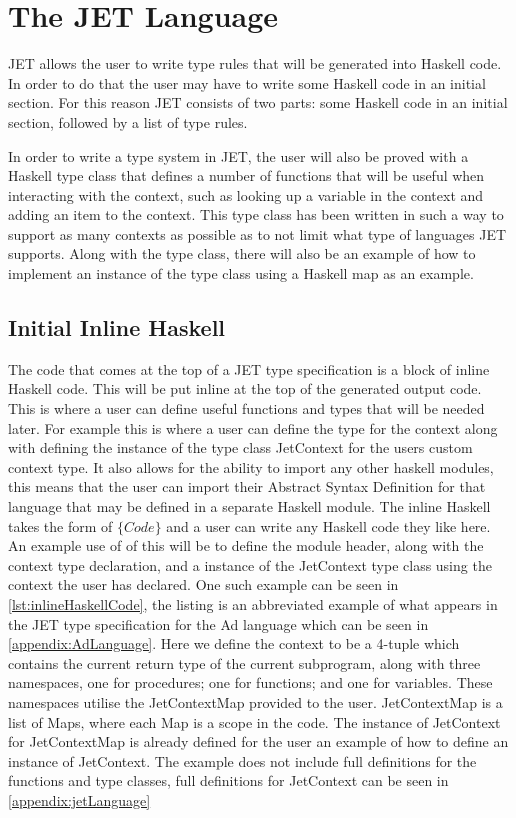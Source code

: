\section{The JET Language}

JET allows the user to write type rules that will be generated into Haskell code.
In order to do that the user may have to write some Haskell code in an initial section.
For this reason JET consists of two parts: some Haskell code in an initial section, followed by a list of type rules.

In order to write a type system in JET, the user will also be proved with a Haskell type class that defines a number of functions that will be useful when interacting with the context, such as looking up a variable in the context and adding an item to the context.
This type class has been written in such a way to support as many contexts as possible as to not limit what type of languages JET supports.
Along with the type class, there will also be an example of how to implement an instance of the type class using a Haskell map as an example.

\subsection{Initial Inline Haskell}
The code that comes at the top of a JET type specification is a block of inline Haskell code.
This will be put inline at the top of the generated output code.
This is where a user can define useful functions and types that will be needed later.
For example this is where a user can define the type for the context along with defining the instance of the type class JetContext for the users custom context type.
It also allows for the ability to import any other haskell modules, this means that the user can import their Abstract Syntax Definition for that language that may be defined in a separate Haskell module.
The inline Haskell takes the form of $\{Code\}$ and a user can write any Haskell code they like here.
An example use of of this will be to define the module header, along with the context type declaration, and a instance of the JetContext type class using the context the user has declared.
One such example can be seen in \autoref{lst:inlineHaskellCode}, the listing is an abbreviated example of what appears in the JET type specification for the Ad language which can be seen in \autoref{appendix:AdLanguage}.
Here we define the context to be a 4-tuple which contains the current return type of the current subprogram, along with three namespaces, one for procedures; one for functions; and one for variables.
These namespaces utilise the JetContextMap provided to the user.
JetContextMap is a list of Maps, where each Map is a scope in the code.
The instance of JetContext for JetContextMap is already defined for the user an example of how to define an instance of JetContext.
The example does not include full definitions for the functions and type classes, full definitions for JetContext can be seen in \autoref{appendix:jetLanguage}

